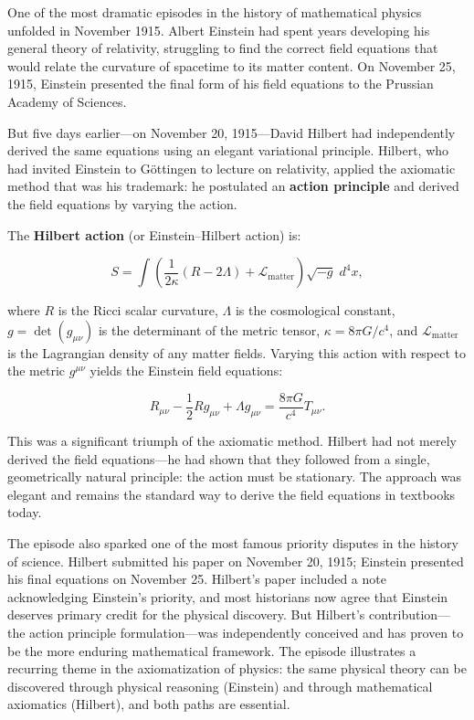 One of the most dramatic episodes in the history of mathematical physics unfolded in November 1915. Albert Einstein had spent years developing his general theory of relativity, struggling to find the correct field equations that would relate the curvature of spacetime to its matter content. On November 25, 1915, Einstein presented the final form of his field equations to the Prussian Academy of Sciences.

But five days earlier---on November 20, 1915---David Hilbert had independently derived the same equations using an elegant variational principle. Hilbert, who had invited Einstein to G\"ottingen to lecture on relativity, applied the axiomatic method that was his trademark: he postulated an \textbf{action principle} and derived the field equations by varying the action.

The \textbf{Hilbert action} (or Einstein--Hilbert action) is:

\[
S = \int \left( \frac{1}{2\kappa} (R - 2\Lambda) + \mathcal{L}_{\text{matter}} \right) \sqrt{-g} \; d^4x,
\]

where $R$ is the Ricci scalar curvature, $\Lambda$ is the cosmological constant, $g = \det(g_{\mu\nu})$ is the determinant of the metric tensor, $\kappa = 8\pi G / c^4$, and $\mathcal{L}_{\text{matter}}$ is the Lagrangian density of any matter fields. Varying this action with respect to the metric $g^{\mu\nu}$ yields the Einstein field equations:

\[
R_{\mu\nu} - \frac{1}{2}R g_{\mu\nu} + \Lambda g_{\mu\nu} = \frac{8\pi G}{c^4} T_{\mu\nu}.
\]

This was a significant triumph of the axiomatic method. Hilbert had not merely derived the field equations---he had shown that they followed from a single, geometrically natural principle: the action must be stationary. The approach was elegant and remains the standard way to derive the field equations in textbooks today.

The episode also sparked one of the most famous priority disputes in the history of science. Hilbert submitted his paper on November 20, 1915; Einstein presented his final equations on November 25. Hilbert's paper included a note acknowledging Einstein's priority, and most historians now agree that Einstein deserves primary credit for the physical discovery. But Hilbert's contribution---the action principle formulation---was independently conceived and has proven to be the more enduring mathematical framework. The episode illustrates a recurring theme in the axiomatization of physics: the same physical theory can be discovered through physical reasoning (Einstein) and through mathematical axiomatics (Hilbert), and both paths are essential.

